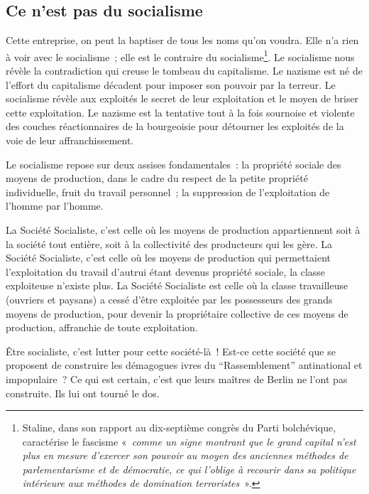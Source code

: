 \documentclass[french,twoside]{book} %
\begin{document}
\subsection[Ce n’est pas du socialisme]{Ce n’est pas du socialisme}
\noindent Cette entreprise, on peut la baptiser de tous les noms qu’on voudra. Elle n’a rien à voir avec le socialisme ; elle est le contraire du socialisme\footnote{Staline, dans son rapport au dix-septième congrès du Parti bolchévique, caractérise le fascisme « \emph{comme un signe montrant que le grand capital n’est plus en mesure d’exercer son pouvoir au moyen des anciennes méthodes de parlementarisme et de démocratie, ce qui l’oblige à recourir dans sa politique intérieure aux méthodes de domination terroristes} ».}. Le socialisme nous révèle la contradiction qui creuse le tombeau du capitalisme. Le nazisme est né de l’effort du capitalisme décadent pour imposer son pouvoir par la terreur. Le socialisme révèle aux exploités le secret de leur exploitation et le moyen de briser cette exploitation. Le nazisme est la tentative tout à la fois sournoise et violente des couches réactionnaires de la bourgeoisie pour détourner les exploités de la voie de leur affranchissement.\par
Le socialisme repose sur deux assises fondamentales : la propriété sociale des moyens de production, dans le cadre du respect de la petite propriété individuelle, fruit du travail personnel ; la suppression de l’exploitation de l’homme par l’homme.\par
La Société Socialiste, c’est celle où les moyens de production appartiennent soit à la société tout entière, soit à la collectivité des producteurs qui les gère. La Société Socialiste, c’est celle où les moyens de production qui permettaient l’exploitation du travail d’autrui étant devenus propriété sociale, la classe exploiteuse n’existe plus. La Société Socialiste est celle où la classe travailleuse (ouvriers et paysans) a cessé d’être exploitée par les possesseurs des grands moyens de production, pour devenir la propriétaire collective de ces moyens de production, affranchie de toute exploitation.\par
Être socialiste, c’est lutter pour cette société-là ! Est-ce cette société que se proposent de construire les démagogues ivres du “Rassemblement” antinational et impopulaire ? Ce qui est certain, c’est que leurs maîtres de Berlin ne l’ont pas construite. Ils lui ont tourné le dos.
\renewcommand{\leftmark}{4 – Discours anticapitalistes et subvention des magnats}
\end{document}
